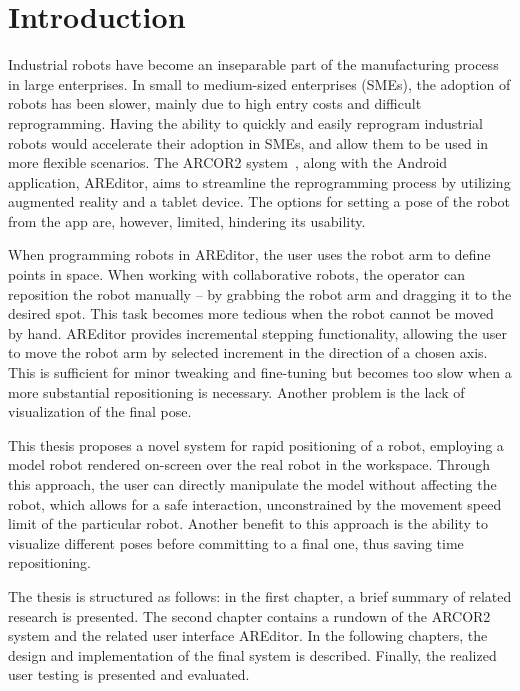 \chapter{Introduction}

Industrial robots have become an inseparable part of the manufacturing process in large enterprises. In small to medium-sized enterprises (SMEs), the adoption of robots has been slower, mainly due to high entry costs and difficult reprogramming. Having the ability to quickly and easily reprogram industrial robots would accelerate their adoption in SMEs, and allow them to be used in more flexible scenarios. The ARCOR2 system~\cite{kapinus2023arcor2}, along with the Android application, AREditor, aims to streamline the reprogramming process by utilizing augmented reality and a tablet device.  The options for setting a pose of the robot from the app are, however, limited, hindering its usability. 

When programming robots in AREditor, the user uses the robot arm to define points in space. When working with collaborative robots, the operator can reposition the robot manually -- by grabbing the robot arm and dragging it to the desired spot. This task becomes more tedious when the robot cannot be moved by hand. AREditor provides incremental stepping functionality, allowing the user to move the robot arm by selected increment in the direction of a chosen axis. This is sufficient for minor tweaking and fine-tuning but becomes too slow when a more substantial repositioning is necessary. Another problem is the lack of visualization of the final pose. 

This thesis proposes a novel system for rapid positioning of a robot, employing a model robot rendered on-screen over the real robot in the workspace. Through this approach, the user can directly manipulate the model without affecting the robot, which allows for a safe interaction, unconstrained by the movement speed limit of the particular robot. Another benefit to this approach is the ability to visualize different poses before committing to a final one, thus saving time repositioning. 

The thesis is structured as follows: in the first chapter, a brief summary of related research is presented. The second chapter contains a rundown of the ARCOR2 system and the related user interface AREditor. In the following chapters, the design and implementation of the final system is described. Finally, the realized user testing is presented and evaluated. 

